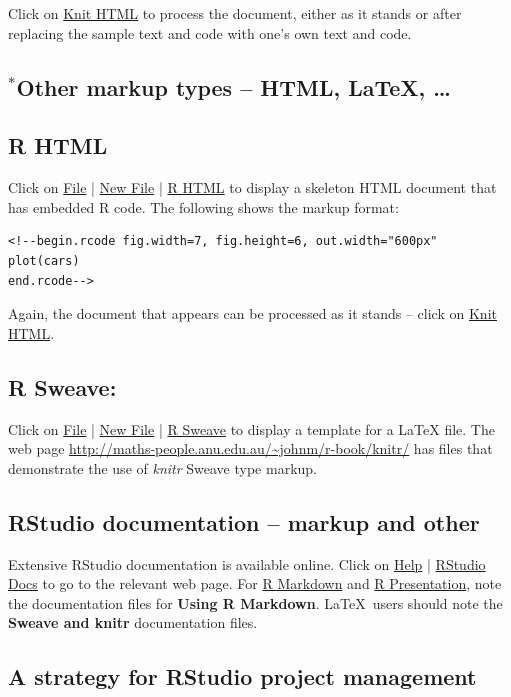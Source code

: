 Click on \underline{Knit HTML} to process the document, either as it
stands or after replacing the sample text and code with one's own text
and code.

\subsection{$^*$Other markup types -- HTML,  LaTeX, \ldots}

\subsection*{R HTML}

Click on \underline{File} | \underline{New File} | \underline{R HTML}
to display a skeleton HTML document that has embedded R code.
The following shows the markup format:
\begin{verbatim}
<!--begin.rcode fig.width=7, fig.height=6, out.width="600px"
plot(cars)
end.rcode-->
\end{verbatim}

Again, the document that appears can be processed as it stands --
click on \underline{Knit HTML}.

\subsection*{R Sweave: }

Click on \underline{File} | \underline{New
  File} | \underline{R Sweave} to display a template for a LaTeX file.
The web page \url{http://maths-people.anu.edu.au/~johnm/r-book/knitr/} has
files that demonstrate the use of {\em knitr} Sweave type markup.

\subsection{RStudio documentation -- markup and other}

Extensive RStudio documentation is available online.  Click on
\underline{Help} | \underline{RStudio Docs} to go to the relevant web
page. For \underline{R Markdown} and \underline{R Presentation}, note
the documentation files for {\bf Using R Markdown}.  \LaTeX\ users
should note the {\bf Sweave and knitr} documentation files.

\subsection{A strategy for RStudio project management}

